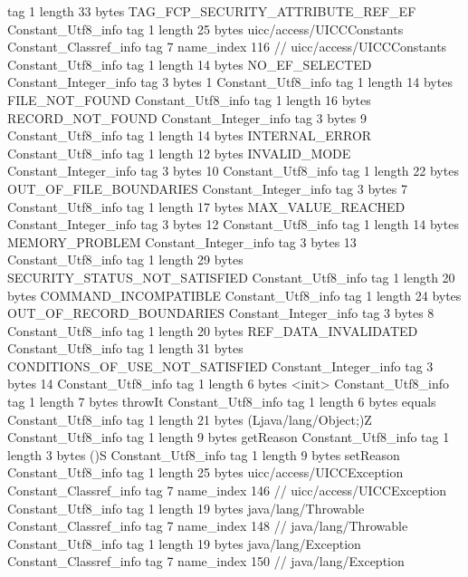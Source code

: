 {{{			tag	1
			length	33
			bytes	TAG_FCP_SECURITY_ATTRIBUTE_REF_EF
		}
		Constant_Utf8_info {
			tag	1
			length	25
			bytes	uicc/access/UICCConstants
		}
		Constant_Classref_info {
			tag	7
			name_index	116		// uicc/access/UICCConstants
		}
		Constant_Utf8_info {
			tag	1
			length	14
			bytes	NO_EF_SELECTED
		}
		Constant_Integer_info {
			tag	3
			bytes	1
		}
		Constant_Utf8_info {
			tag	1
			length	14
			bytes	FILE_NOT_FOUND
		}
		Constant_Utf8_info {
			tag	1
			length	16
			bytes	RECORD_NOT_FOUND
		}
		Constant_Integer_info {
			tag	3
			bytes	9
		}
		Constant_Utf8_info {
			tag	1
			length	14
			bytes	INTERNAL_ERROR
		}
		Constant_Utf8_info {
			tag	1
			length	12
			bytes	INVALID_MODE
		}
		Constant_Integer_info {
			tag	3
			bytes	10
		}
		Constant_Utf8_info {
			tag	1
			length	22
			bytes	OUT_OF_FILE_BOUNDARIES
		}
		Constant_Integer_info {
			tag	3
			bytes	7
		}
		Constant_Utf8_info {
			tag	1
			length	17
			bytes	MAX_VALUE_REACHED
		}
		Constant_Integer_info {
			tag	3
			bytes	12
		}
		Constant_Utf8_info {
			tag	1
			length	14
			bytes	MEMORY_PROBLEM
		}
		Constant_Integer_info {
			tag	3
			bytes	13
		}
		Constant_Utf8_info {
			tag	1
			length	29
			bytes	SECURITY_STATUS_NOT_SATISFIED
		}
		Constant_Utf8_info {
			tag	1
			length	20
			bytes	COMMAND_INCOMPATIBLE
		}
		Constant_Utf8_info {
			tag	1
			length	24
			bytes	OUT_OF_RECORD_BOUNDARIES
		}
		Constant_Integer_info {
			tag	3
			bytes	8
		}
		Constant_Utf8_info {
			tag	1
			length	20
			bytes	REF_DATA_INVALIDATED
		}
		Constant_Utf8_info {
			tag	1
			length	31
			bytes	CONDITIONS_OF_USE_NOT_SATISFIED
		}
		Constant_Integer_info {
			tag	3
			bytes	14
		}
		Constant_Utf8_info {
			tag	1
			length	6
			bytes	<init>
		}
		Constant_Utf8_info {
			tag	1
			length	7
			bytes	throwIt
		}
		Constant_Utf8_info {
			tag	1
			length	6
			bytes	equals
		}
		Constant_Utf8_info {
			tag	1
			length	21
			bytes	(Ljava/lang/Object;)Z
		}
		Constant_Utf8_info {
			tag	1
			length	9
			bytes	getReason
		}
		Constant_Utf8_info {
			tag	1
			length	3
			bytes	()S
		}
		Constant_Utf8_info {
			tag	1
			length	9
			bytes	setReason
		}
		Constant_Utf8_info {
			tag	1
			length	25
			bytes	uicc/access/UICCException
		}
		Constant_Classref_info {
			tag	7
			name_index	146		// uicc/access/UICCException
		}
		Constant_Utf8_info {
			tag	1
			length	19
			bytes	java/lang/Throwable
		}
		Constant_Classref_info {
			tag	7
			name_index	148		// java/lang/Throwable
		}
		Constant_Utf8_info {
			tag	1
			length	19
			bytes	java/lang/Exception
		}
		Constant_Classref_info {
			tag	7
			name_index	150		// java/lang/Exception
}}}
